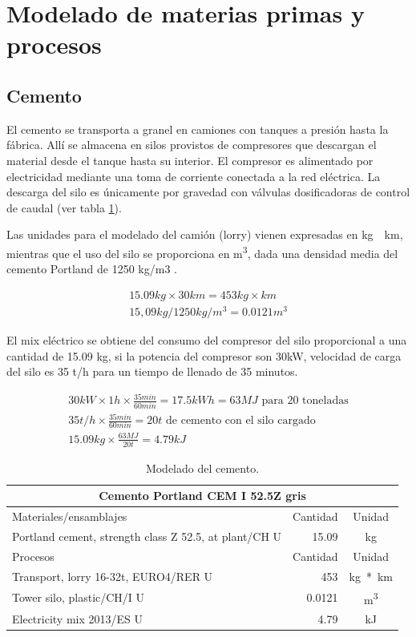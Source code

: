 \section{Modelado de materias primas y procesos}\label{sec:modeladoprocesos}
\subsection{Cemento}
El cemento se transporta a granel en camiones con tanques a presión hasta la fábrica. Allí se almacena en silos provistos de compresores que descargan el material desde el tanque hasta su interior. El compresor es alimentado por electricidad mediante una toma de corriente conectada a la red eléctrica. La descarga del silo es únicamente por gravedad con válvulas dosificadoras de control de caudal (ver tabla \ref{modeladodelcemento}).

Las unidades para el modelado del camión (lorry) vienen expresadas en \si{kg\times km}, mientras que el uso del silo se proporciona en \si{m^3}, dada una densidad media del cemento Portland de 1250 \si{kg/m3} \cite{website:cement}.

\begin{gather}
15.09 kg \times 30 km = 453 kg\times km\\
15,09 kg / 1250 kg/m^3 = 0.0121 m^3
\end{gather}

El mix eléctrico se obtiene del consumo del compresor del silo proporcional a una cantidad de 15.09 \si{kg}, si la potencia del compresor son 30kW, velocidad de carga del silo es 35 \si{\tonne/h} para un tiempo de llenado de 35 minutos.

\begin{gather}
30 kW \times 1 h \times \frac{35 min}{60 min} = 17.5 kWh = 63 MJ \text{ para 20 toneladas}\\
35 t/h \times \frac{35 min}{60 min} = 20 t \text{ de cemento con el silo cargado}\\
15.09 kg \times \frac{63 MJ}{20 t} = 4.79 kJ
\end{gather}

\begin{table}[!htb]
\centering
\begin{tabular}{p{8cm}rc}
\toprule
\multicolumn{3}{c}{Cemento Portland CEM I 52.5Z gris}\\
\midrule
Materiales/ensamblajes & Cantidad & Unidad\\
\midrule
Portland cement, strength class Z 52.5, at plant/CH U & 15.09 & \si{kg}\\
\midrule
Procesos & Cantidad & Unidad\\
\midrule
Transport, lorry 16-32t, EURO4/RER U & 453 & \si{kg*km}\\
Tower silo, plastic/CH/I U & 0.0121 & \si{m^3}\\
Electricity mix 2013/ES U & 4.79 & \si{kJ}\\
\bottomrule
\end{tabular}
\caption{Modelado del cemento.}
\label{modeladodelcemento}
\end{table}

